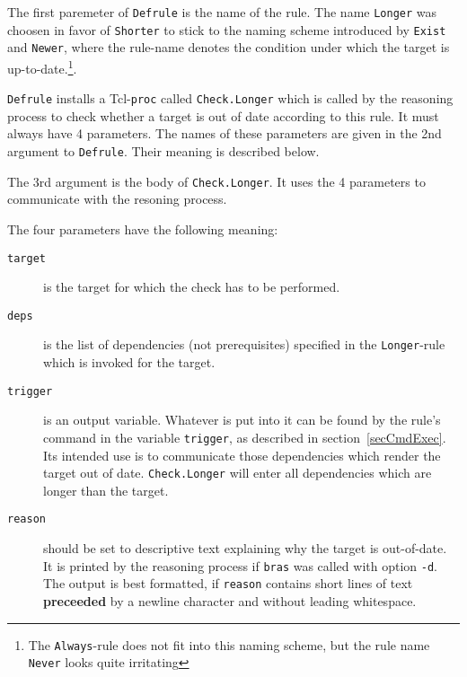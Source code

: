\documentclass[12pt]{article}
\newcommand{\bras}{\texttt{bras}}
\begin{document}
The first paremeter of \texttt{Defrule} is the name of the
rule. The name \texttt{Longer} was choosen in favor of \texttt{Shorter}
to stick to the naming scheme introduced by \texttt{Exist} and
\texttt{Newer}, where the rule-name denotes the condition under which
the target is up-to-date.\footnote{The \texttt{Always}-rule does not
fit into this naming scheme, but the rule name \texttt{Never} looks
quite irritating}.

\texttt{Defrule} installs a Tcl-\texttt{proc} called
\texttt{Check.Longer} which is called by the reasoning process to
check whether a target is out of date according to this rule. It must
always have 4 parameters. The names of these parameters are given in
the 2nd argument to \texttt{Defrule}. Their meaning is described below.

The 3rd argument is the body of \texttt{Check.Longer}. It uses the 4
parameters to communicate with the resoning process.

The four parameters have the following meaning:

\begin{description}
\item[\texttt{target}]
is the target for which the check has to be
performed. 

\item[\texttt{deps}]
is the list of dependencies (not prerequisites)
specified in the \texttt{Longer}-rule which is invoked for the target.

\item[\texttt{trigger}]
is an output variable. Whatever is put into it can be found by the
rule's command in the variable \texttt{trigger}, as described in
section~\ref{secCmdExec}. Its intended use is to communicate those
dependencies which render the target out of
date. \texttt{Check.Longer} will enter all dependencies which are
longer than the target.

\item[\texttt{reason}] should be set to descriptive text explaining
why the target is out-of-date. It is printed by the reasoning process
if \bras{} was called with option \texttt{-d}. The output is best
formatted, if \texttt{reason} contains short lines of text
\textbf{preceeded} by a newline character and without leading
whitespace.
\end{description}
\end{document}
